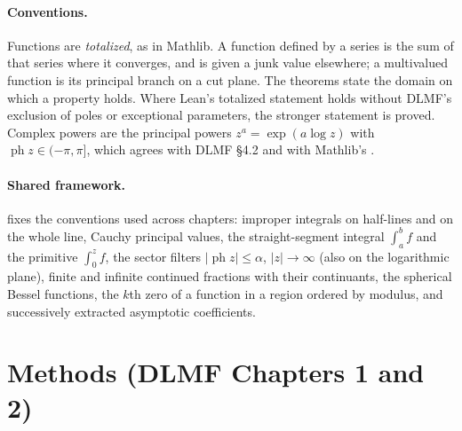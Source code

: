 \documentclass[11pt,a4paper]{article}
\begin{document}
\paragraph{Conventions.} Functions are \emph{totalized}, as in Mathlib. A function defined by
a series is the sum of that series where it converges, and is given a junk value elsewhere;
a multivalued function is its principal branch on a cut plane. The theorems state the domain
on which a property holds. Where Lean's totalized statement holds without DLMF's exclusion
of poles or exceptional parameters, the stronger statement is proved. Complex powers are the
principal powers $z^a=\exp(a\log z)$ with $\operatorname{ph}z\in(-\pi,\pi]$, which agrees with
DLMF \S4.2 and with Mathlib's .

\paragraph{Shared framework.}  fixes the conventions used across
chapters: improper integrals on half-lines and on the whole line, Cauchy principal values,
the straight-segment integral $\int_a^b f$ and the primitive $\int_0^z f$, the sector filters
$|\operatorname{ph}z|\le\alpha$, $|z|\to\infty$ (also on the logarithmic plane), finite and
infinite continued fractions with their continuants, the spherical Bessel functions, the
$k$th zero of a function in a region ordered by modulus, and successively extracted
asymptotic coefficients.

\section{Methods (DLMF Chapters 1 and 2)}
\end{document}
